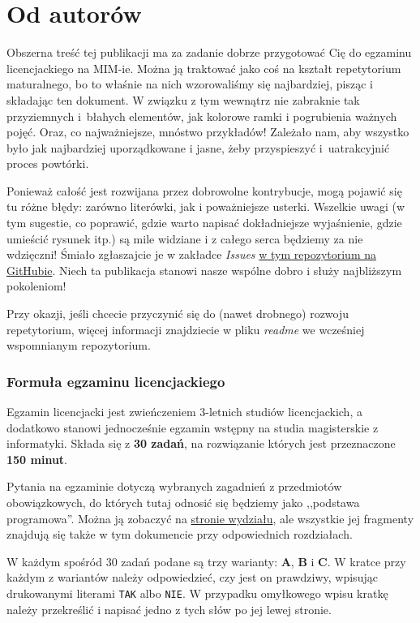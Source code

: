 \chapter*{Od autorów}

Obszerna treść tej publikacji ma za zadanie dobrze przygotować Cię do egzaminu licencjackiego na MIM-ie. Można ją traktować jako coś na kształt repetytorium maturalnego, bo to właśnie na nich wzorowaliśmy się najbardziej, pisząc i składając ten dokument. W związku z tym wewnątrz nie zabraknie tak przyziemnych i~błahych elementów, jak kolorowe ramki i pogrubienia ważnych pojęć. Oraz, co najważniejsze, mnóstwo przykładów! Zależało nam, aby wszystko było jak najbardziej uporządkowane i jasne, żeby przyspieszyć i~uatrakcyjnić proces powtórki.

Ponieważ całość jest rozwijana przez dobrowolne kontrybucje, mogą pojawić się tu różne błędy: zarówno literówki, jak i poważniejsze usterki. Wszelkie uwagi (w tym sugestie, co poprawić, gdzie warto napisać dokładniejsze wyjaśnienie, gdzie umieścić rysunek itp.) są mile widziane i z całego serca będziemy za nie wdzięczni! Śmiało zgłaszajcie je w zakładce \textit{Issues} \href{https://github.com/Buarzej/Repetytorium-licencjackie-MIMUW}{w tym repozytorium na GitHubie}. Niech ta publikacja stanowi nasze wspólne dobro i służy najbliższym pokoleniom!

Przy okazji, jeśli chcecie przyczynić się do (nawet drobnego) rozwoju repetytorium, więcej informacji znajdziecie w pliku \textit{readme} we wcześniej wspomnianym repozytorium.

\subsection{Formuła egzaminu licencjackiego}

Egzamin licencjacki jest zwieńczeniem 3-letnich studiów licencjackich, a dodatkowo stanowi jednocześnie egzamin wstępny na studia magisterskie z informatyki. Składa się z \textbf{30 zadań}, na rozwiązanie których jest przeznaczone \textbf{150 minut}.

Pytania na egzaminie dotyczą wybranych zagadnień z przedmiotów obowiązkowych, do których tutaj odnosić się będziemy jako ,,podstawa programowa''. Można ją zobaczyć na \href{https://www.mimuw.edu.pl/pytania-na-egzamin-licencjacki#informatyka}{stronie wydziału}, ale wszystkie jej fragmenty znajdują się także w tym dokumencie przy odpowiednich rozdziałach.

W każdym spośród 30 zadań podane są trzy warianty: \textbf{A}, \textbf{B} i \textbf{C}. W kratce przy każdym z wariantów należy odpowiedzieć, czy jest on prawdziwy, wpisując drukowanymi literami \texttt{TAK} albo \texttt{NIE}. W przypadku omyłkowego wpisu kratkę należy przekreślić i napisać jedno z tych słów po jej lewej stronie.

